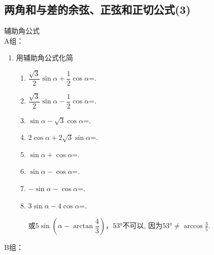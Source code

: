 \subsection{两角和与差的余弦、正弦和正切公式(3)}
\zsd 辅助角公式 \\
A组：
\begin{enumerate}
\item 用辅助角公式化简
\begin{enumerate}
    \item $\dfrac{\sqrt{3}}{2}\sin\alpha+\dfrac{1}{2}\cos\alpha$=. 
    
    \item $\dfrac{\sqrt{3}}{2}\sin\alpha-\dfrac{1}{2}\cos\alpha$=. 
    
    \item $\sin\alpha-\sqrt{3}\cos\alpha$=. 
    
    \item $2\cos\alpha+2\sqrt{3}\sin\alpha$=. 
    
    \item $\sin\alpha+\cos\alpha$=. 
    
    \item $\sin\alpha-\cos\alpha$=. 
    
    \item $-\sin\alpha-\cos\alpha$=. 
    
    \item $3\sin\alpha-4\cos\alpha$=. 
    \begin{jieda}
    或$5\sin\left(\alpha-\arctan\dfrac{4}{3}\right)$，$\ang{53}$不可以, 因为$\ang{53}\neq\arccos\frac{3}{5}$. 
    \end{jieda}
\end{enumerate}
\end{enumerate}
B组：
